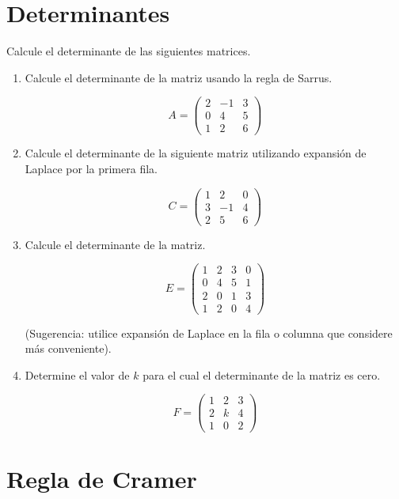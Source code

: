 \documentclass[12pt,letterpaper]{article}
\begin{document}
\section*{Determinantes}

Calcule el determinante de las siguientes matrices.

\begin{enumerate}

\item Calcule el determinante de la matriz usando la regla de Sarrus.

\[
A=
\begin{pmatrix}
2 & -1 & 3\\
0 & 4 & 5\\
1 & 2 & 6
\end{pmatrix}
\]

\item Calcule el determinante de la siguiente matriz utilizando expansión de Laplace por la primera fila.

\[
C=
\begin{pmatrix}
1 & 2 & 0\\
3 & -1 & 4\\
2 & 5 & 6
\end{pmatrix}
\]


\item Calcule el determinante de la matriz.

\[
E=
\begin{pmatrix}
1 & 2 & 3 & 0\\
0 & 4 & 5 & 1\\
2 & 0 & 1 & 3\\
1 & 2 & 0 & 4
\end{pmatrix}
\]

(Sugerencia: utilice expansión de Laplace en la fila o columna que considere más conveniente).

\item Determine el valor de $k$ para el cual el determinante de la matriz es cero.

\[
F=
\begin{pmatrix}
1 & 2 & 3\\
2 & k & 4\\
1 & 0 & 2
\end{pmatrix}
\]

\end{enumerate}

\vspace{0.3cm}
\section*{Regla de Cramer}
\end{document}
